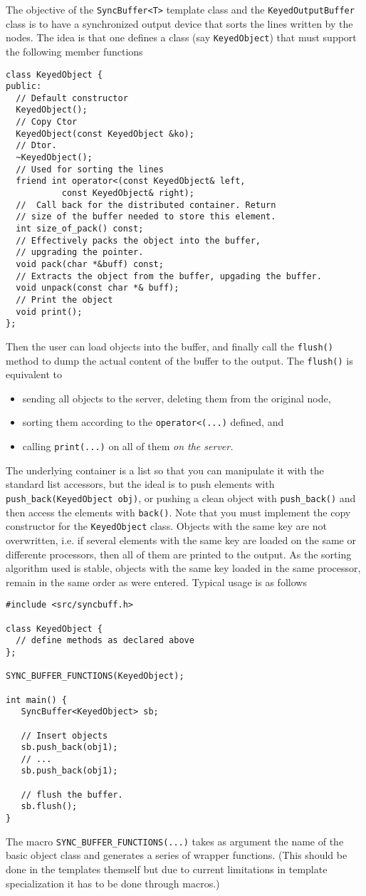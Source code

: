 The objective of the \verb+SyncBuffer<T>+ template class and the
\verb+KeyedOutputBuffer+ class is to have a synchronized output device
that sorts the lines written by the nodes.  The idea is that one
defines a class (say \verb+KeyedObject+) that must support the
following member functions
%
\begin{verbatim}
class KeyedObject {
public:
  // Default constructor 
  KeyedObject();
  // Copy Ctor
  KeyedObject(const KeyedObject &ko);
  // Dtor.
  ~KeyedObject();
  // Used for sorting the lines
  friend int operator<(const KeyedObject& left, 
           const KeyedObject& right);
  //  Call back for the distributed container. Return
  // size of the buffer needed to store this element.
  int size_of_pack() const;
  // Effectively packs the object into the buffer, 
  // upgrading the pointer. 
  void pack(char *&buff) const;
  // Extracts the object from the buffer, upgading the buffer. 
  void unpack(const char *& buff);
  // Print the object
  void print();
};
\end{verbatim}
%
Then the user can load objects into the buffer, and finally call the
\verb+flush()+ method to dump the actual content of the buffer to the
output. The \verb+flush()+ is equivalent to 
%
\begin{itemize}
\item sending all objects to the server, deleting them from the
  original node, 
\item sorting them according to the \verb+operator<(...)+ defined, and
\item calling \verb+print(...)+ on all of them \emph{on the server.}
\end{itemize}
%
The underlying container is a list so that you can manipulate it with
the standard list accessors, but the ideal is to push elements with
\verb+push_back(KeyedObject obj)+, or pushing a clean object with
\verb+push_back()+ and then access the elements with
\verb+back()+. Note that you must implement the copy constructor for
the \verb+KeyedObject+ class. Objects with the same key are not
overwritten, i.e. if several elements with the same key are loaded on
the same or differente processors, then all of them are printed to the
output. As the sorting algorithm used is stable, objects with the same
key loaded in the same processor,  remain in the same order as were
entered. Typical usage is as follows
%
\begin{verbatim}
#include <src/syncbuff.h>

class KeyedObject {
  // define methods as declared above
};

SYNC_BUFFER_FUNCTIONS(KeyedObject);

int main() {
   SyncBuffer<KeyedObject> sb;

   // Insert objects
   sb.push_back(obj1);
   // ...
   sb.push_back(obj1);
   
   // flush the buffer. 
   sb.flush();
}
\end{verbatim}
%
The macro \verb+SYNC_BUFFER_FUNCTIONS(...)+ takes as argument the name
of the basic object class and generates a series of wrapper
functions. (This should be done in the templates themself but due to
current limitations in template specialization it has to be done
through macros.)

